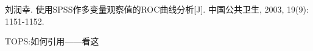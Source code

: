 \newpage
\begin{thebibliography}{9}%
	
	\setlength{\itemsep}{-1mm}
	 刘润幸. 使用SPSS作多变量观察值的ROC曲线分析[J]. 中国公共卫生, 2003, 19(9): 1151-1152.
	
	
	TOPS:如何引用——看这\textsuperscript{\cite{bib:one}}
	
\end{thebibliography}	